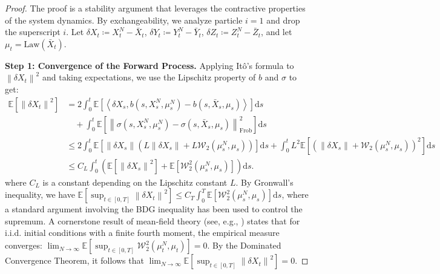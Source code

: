 \documentclass[qian]{imsart}
\newcommand{\E}{\mathbb{E}}
\newcommand{\dd}{\mathrm{d}}
\newcommand{\norm}[1]{\left\lVert#1\right\rVert}
\newcommand{\scpr}[2]{\left\langle #1, #2 \right\rangle}
\newcommand{\wass}{\mathcal{W}_2}
\newcommand{\Law}{\mathrm{Law}}
\theoremstyle{plain}
\theoremstyle{definition}
\begin{document}
\begin{proof}
The proof is a stability argument that leverages the contractive properties of the system dynamics. By exchangeability, we analyze particle $i=1$ and drop the superscript $i$. Let $\delta X_t \coloneqq X^N_t - \bar{X}_t$, $\delta Y_t \coloneqq Y^N_t - \bar{Y}_t$, $\delta Z_t \coloneqq Z^N_t - \bar{Z}_t$, and let $\mu_t = \Law(\bar{X}_t)$.

\textbf{Step 1: Convergence of the Forward Process.}
Applying Itô's formula to $\norm{\delta X_t}^2$ and taking expectations, we use the Lipschitz property of $b$ and $\sigma$ to get:
\begin{align*}
\E[\norm{\delta X_t}^2] &= 2\int_0^t \E[\scpr{\delta X_s}{b(s,X^N_s,\mu^N_s) - b(s,\bar{X}_s,\mu_s)}] \dd s \\
&\quad + \int_0^t \E[\norm{\sigma(s,X^N_s,\mu^N_s) - \sigma(s,\bar{X}_s,\mu_s)}_{\mathrm{Frob}}^2] \dd s \\
&\le 2 \int_0^t \E\left[ \norm{\delta X_s}\left(L\norm{\delta X_s} + L\wass(\mu^N_s, \mu_s)\right) \right] \dd s + \int_0^t L^2\E\left[(\norm{\delta X_s} + \wass(\mu^N_s, \mu_s))^2\right] \dd s \\
&\le C_L \int_0^t \left( \E[\norm{\delta X_s}^2] + \E[\wass^2(\mu^N_s, \mu_s)] \right) \dd s.
\end{align*}
where $C_L$ is a constant depending on the Lipschitz constant $L$. By Gronwall's inequality, we have $\E[\sup_{t \in [0,T]}\norm{\delta X_t}^2] \le C_T \int_0^T \E[\wass^2(\mu^N_s, \mu_s)] \dd s$, where a standard argument involving the BDG inequality has been used to control the supremum. A cornerstone result of mean-field theory (see, e.g., \cite{CarmonaDelarue2018}) states that for i.i.d. initial conditions with a finite fourth moment, the empirical measure converges: $\lim_{N\to\infty} \E[\sup_{t \in [0,T]} \wass^2(\mu^N_t, \mu_t)] = 0$.
By the Dominated Convergence Theorem, it follows that $\lim_{N\to\infty} \E[\sup_{t \in [0,T]} \norm{\delta X_t}^2] = 0$.


\end{proof}
\end{document}
